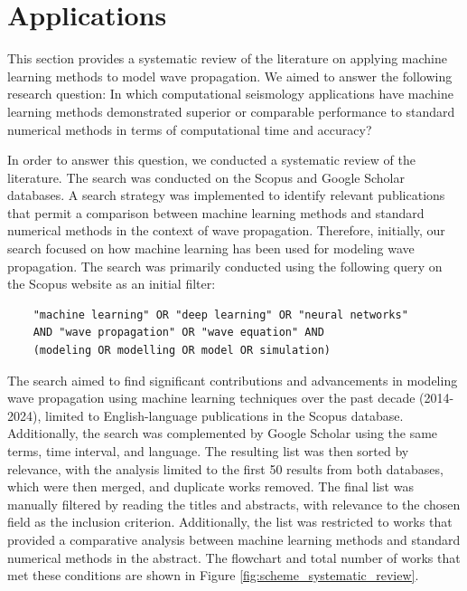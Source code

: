 \documentclass[11pt,twoside]{article}
\begin{document}
\section{Applications}\label{sec:applications}

This section provides a systematic review of the literature on applying machine learning methods to model 
wave propagation. We aimed to answer the following research question: In which computational seismology applications 
have machine learning methods demonstrated superior or comparable performance to standard numerical methods in terms 
of computational time and accuracy?
 
In order to answer this question, we conducted a systematic review of the literature. The search was conducted on 
the Scopus and Google Scholar databases. A search strategy was implemented to identify relevant publications that 
permit a comparison between machine learning methods and standard numerical methods in the context of wave propagation. 
Therefore, initially, our search focused on how machine learning has been used for modeling wave propagation. 
The search was primarily conducted using the following query on the Scopus website as an initial filter:

\begin{center}
    \begin{BVerbatim}
    "machine learning" OR "deep learning" OR "neural networks" 
    AND "wave propagation" OR "wave equation" AND 
    (modeling OR modelling OR model OR simulation)
    \end{BVerbatim}
\end{center}   

The search aimed to find significant contributions and advancements in modeling wave propagation using machine
 learning techniques over the past decade (2014-2024), limited to English-language publications in the Scopus 
 database. Additionally, the search was complemented by Google Scholar using the same terms, time interval, and 
 language. The resulting list was then sorted by relevance, with the analysis limited to the first 50 results from 
 both databases, which were then merged, and duplicate works removed. The final list was manually filtered by 
 reading the titles and abstracts, with relevance to the chosen field as the inclusion criterion. Additionally, 
 the list was restricted to works that provided a comparative analysis between machine learning methods and 
 standard numerical methods in the abstract. The flowchart and total number of works that met these conditions 
 are shown in Figure \ref{fig:scheme_systematic_review}.
\end{document}

